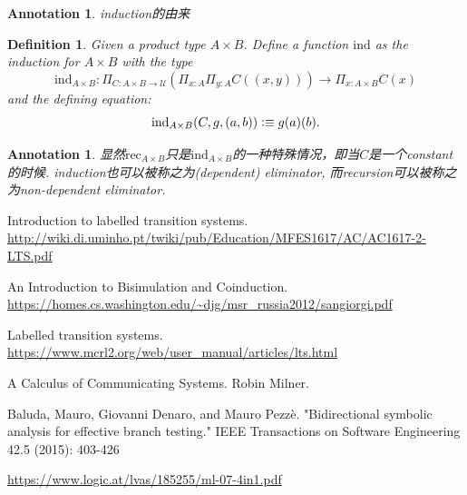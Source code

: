 \documentclass{article}
\newtheorem{definition}[theorem]{Definition}
\newtheorem{annotation}[theorem]{Annotation}
\newcommand{\defeqv}{\vcentcolon\equiv}
\begin{document}
\begin{annotation}
induction的由来
\end{annotation}

\begin{definition}
\rm Given a product type $A \times B$. Define a function $\text{ind}$ as the induction for $A \times B$ with the type
\[
	\text{ind}_{A \times B}: {\Pi}_{C:A \times B \to \mathcal{U}}(\Pi_{x:A}\Pi_{y:A} C((x,y))) \to \Pi_{x:A\times B} C(x)
\]
and the defining equation:
\[
	\text{ind}_{A \times B}(C, g, (a,b)) \defeqv g(a)(b).
\]
\end{definition}

\begin{annotation}
\rm 显然$\text{rec}_{A \times B}$只是$\text{ind}_{A \times B}$的一种特殊情况，即当$C$是一个constant的时候. induction也可以被称之为(dependent) eliminator, 而recursion可以被称之为non-dependent eliminator.
\end{annotation}




\newpage
\begin{thebibliography}{9}
Introduction to labelled transition systems. \newline\url{http://wiki.di.uminho.pt/twiki/pub/Education/MFES1617/AC/AC1617-2-LTS.pdf}

An Introduction to Bisimulation and Coinduction. \newline\url{https://homes.cs.washington.edu/~djg/msr_russia2012/sangiorgi.pdf}

Labelled transition systems. \newline\url{https://www.mcrl2.org/web/user_manual/articles/lts.html}


A Calculus of Communicating Systems. Robin Milner. 

Baluda, Mauro, Giovanni Denaro, and Mauro Pezzè. "Bidirectional symbolic analysis for effective branch testing." IEEE Transactions on Software Engineering 42.5 (2015): 403-426

\url{https://www.logic.at/lvas/185255/ml-07-4in1.pdf}
\end{thebibliography}
\end{document}
